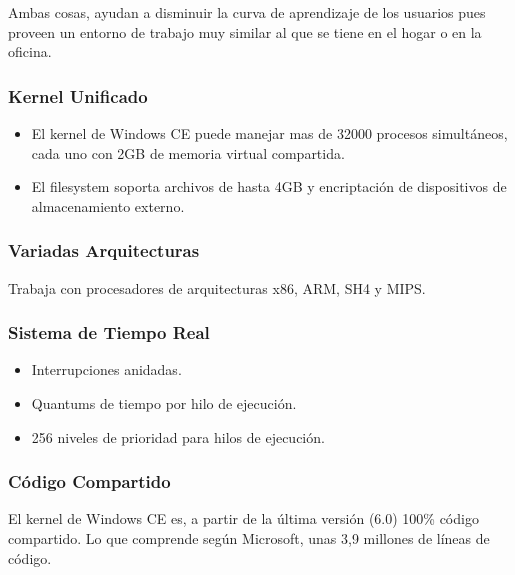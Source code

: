 Ambas cosas, ayudan a disminuir la curva de aprendizaje de los usuarios pues proveen un entorno de trabajo muy similar al que se tiene en el hogar o en la oficina.

\subsubsection*{Kernel Unificado}
\begin{itemize}
	\item El kernel de Windows CE puede manejar mas de 32000 procesos simultáneos, cada uno con 2GB de memoria virtual compartida.
	\item El filesystem soporta archivos de hasta 4GB y encriptación de dispositivos de almacenamiento externo.
\end{itemize}

\subsubsection*{Variadas Arquitecturas}
Trabaja con procesadores de arquitecturas x86, ARM, SH4 y MIPS.

\subsubsection*{Sistema de Tiempo Real}
\begin{itemize}
	\item Interrupciones anidadas.
	\item Quantums de tiempo por hilo de ejecución.
	\item 256 niveles de prioridad para hilos de ejecución.
\end{itemize}

\subsubsection*{Código Compartido}
El kernel de Windows CE es, a partir de la última versión (6.0) 100\% código compartido. Lo que comprende según Microsoft, unas 3,9 millones de líneas de código.

